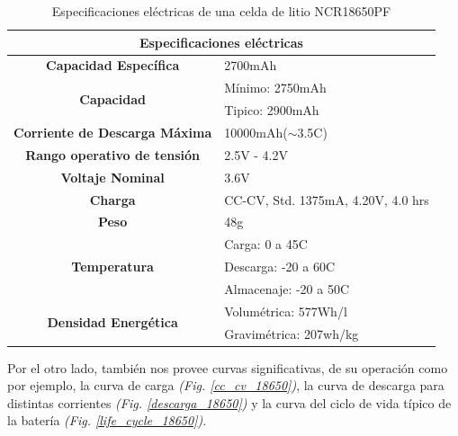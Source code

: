 \documentclass[10pt,a4paper]{article}
\begin{document}
\begin{table}[h]
    \begin{center}
	\begin{tabular}{|c|l|}
	    \hline
	    \multicolumn{2}{|c|}{Especificaciones el\'ectricas}                          \\ \hline
	    \textbf{Capacidad Específica}                 & 2700mAh                            \\ \hline
	    \multirow{2}{*}{\textbf{Capacidad}}           & Mínimo: 2750mAh                    \\ \cline{2-2} 
	    & Tipico: 2900mAh                    \\ \hline
	    \textbf{Corriente de Descarga Máxima}         & 10000mAh($\sim$3.5C)               \\ \hline
	    \textbf{Rango operativo de tensión}           & 2.5V - 4.2V                        \\ \hline
	    \textbf{Voltaje Nominal}                      & 3.6V                               \\ \hline
	    \textbf{Charga}                               & CC-CV, Std. 1375mA, 4.20V, 4.0 hrs \\ \hline
	    \textbf{Peso}                                 & 48g                              \\ \hline
	    \multirow{3}{*}{\textbf{Temperatura}}         & Carga: 0 a 45C                     \\ \cline{2-2} 
	    & Descarga: -20 a 60C                \\ \cline{2-2} 
	    & Almacenaje: -20 a 50C              \\ \hline
	    \multirow{2}{*}{\textbf{Densidad Energética}} & Volum\'etrica: 577Wh/l               \\ \cline{2-2} 
	    & Gravim\'etrica: 207wh/kg             \\ \hline
	\end{tabular}%
	\caption{Especificaciones el\'ectricas de una celda de litio NCR18650PF}
	\label{ncr18650pf_table}
    \end{center}
\end{table}

Por el otro lado, \cite{18650pf} también nos provee curvas significativas, de su
operaci\'on como por ejemplo, la curva de carga \emph{(Fig. \ref{cc_cv_18650})}, 
la curva de descarga para distintas corrientes 
\emph{(Fig. \ref{descarga_18650})} y la curva del ciclo de vida típico de la 
batería \emph{(Fig. \ref{life_cycle_18650})}.
\end{document}
